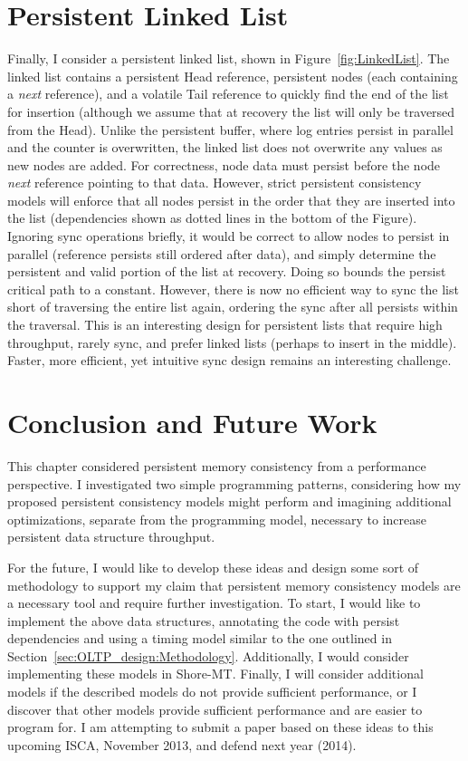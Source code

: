 \section{Persistent Linked List}
\label{sec:PMC_patterns:LinkedList}



Finally, I consider a persistent linked list, shown in Figure~\ref{fig:LinkedList}.
The linked list contains a persistent Head reference, persistent nodes (each containing a \emph{next} reference), and a volatile Tail reference to quickly find the end of the list for insertion (although we assume that at recovery the list will only be traversed from the Head).
Unlike the persistent buffer, where log entries persist in parallel and the counter is overwritten, the linked list does not overwrite any values as new nodes are added.
For correctness, node data must persist before the node \emph{next} reference pointing to that data.
However, strict persistent consistency models will enforce that all nodes persist in the order that they are inserted into the list (dependencies shown as dotted lines in the bottom of the Figure).
Ignoring sync operations briefly, it would be correct to allow nodes to persist in parallel (reference persists still ordered after data), and simply determine the persistent and valid portion of the list at recovery.
Doing so bounds the persist critical path to a constant.
However, there is now no efficient way to sync the list short of traversing the entire list again, ordering the sync after all persists within the traversal.
This is an interesting design for persistent lists that require high throughput, rarely sync, and prefer linked lists (perhaps to insert in the middle).
Faster, more efficient, yet intuitive sync design remains an interesting challenge.

\section{Conclusion and Future Work}
\label{sec:PMC_patterns:Conclusion}

This chapter considered persistent memory consistency from a performance perspective.
I investigated two simple programming patterns, considering how my proposed persistent consistency models might perform and imagining additional optimizations, separate from the programming model, necessary to increase persistent data structure throughput.

For the future, I would like to develop these ideas and design some sort of methodology to support my claim that persistent memory consistency models are a necessary tool and require further investigation.
To start, I would like to implement the above data structures, annotating the code with persist dependencies and using a timing model similar to the one outlined in Section~\ref{sec:OLTP_design:Methodology}.
Additionally, I would consider implementing these models in Shore-MT.
Finally, I will consider additional models if the described models do not provide sufficient performance, or I discover that other models provide sufficient performance and are easier to program for.
I am attempting to submit a paper based on these ideas to this upcoming ISCA, November 2013, and defend next year (2014).

